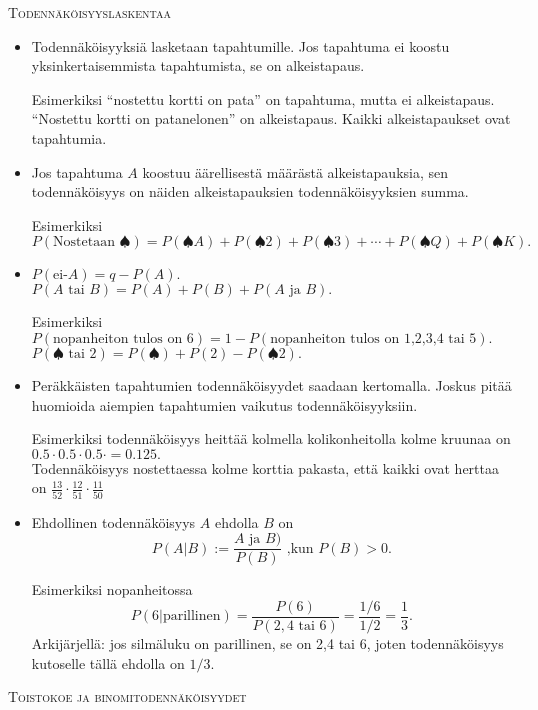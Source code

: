 \documentclass[12pt,leqno,a4paper,oneside]{amsart}
\theoremstyle{definition}
\theoremstyle{remark}
\numberwithin{equation}{section}
\begin{document}
\textsc{Todennäköisyyslaskentaa}
\begin{itemize}
\item
Todennäköisyyksiä lasketaan tapahtumille. Jos tapahtuma ei koostu yksinkertaisemmista tapahtumista, se on alkeistapaus.

Esimerkiksi ``nostettu kortti on pata'' on tapahtuma, mutta ei alkeistapaus. \\
``Nostettu kortti on patanelonen'' on alkeistapaus. Kaikki alkeistapaukset ovat tapahtumia.

\item
Jos tapahtuma $A$ koostuu äärellisestä määrästä alkeistapauksia, sen todennäköisyys on näiden alkeistapauksien todennäköisyyksien summa.

Esimerkiksi 
$$P(\text{Nostetaan }\spadesuit ) = P(\spadesuit A) + P(\spadesuit 2) + P(\spadesuit 3) +\cdots + P(\spadesuit Q ) + P(\spadesuit K).$$

\item
$P(\text{ei-}A) = q - P(A).$\\
$P(A \text{ tai } B) = P(A)+P(B)+P(A\text{ ja } B).$

Esimerkiksi \\
$P(\text{nopanheiton tulos on 6}) = 1 - P(\text{nopanheiton tulos on 1,2,3,4 tai 5}).$\\
$P(\spadesuit \text{ tai } 2) = P(\spadesuit) + P(2) - P(\spadesuit 2).$

\item
Peräkkäisten tapahtumien todennäköisyydet saadaan kertomalla. Joskus pitää huomioida aiempien tapahtumien vaikutus todennäköisyyksiin.

Esimerkiksi todennäköisyys heittää kolmella kolikonheitolla kolme kruunaa on $0.5\cdot 0.5\cdot 0.5\cdot =0.125.$\\
Todennäköisyys nostettaessa kolme korttia pakasta, että kaikki ovat herttaa on
$\frac{13}{52}\cdot\frac{12}{51}\cdot\frac{11}{50}$

\item
Ehdollinen todennäköisyys $A$ ehdolla $B$ on 
$$P(A|B):=\frac{A\text{ ja } B)}{P(B)} \text{ ,kun } P(B)>0.$$

Esimerkiksi nopanheitossa
$$P(6|\text{parillinen}) = \frac{P(6)}{P(2,4 \text{ tai } 6)} = \frac{1/6}{1/2} =\frac{1}{3}.$$ 
Arkijärjellä: jos silmäluku on parillinen, se on 2,4 tai 6, joten todennäköisyys kutoselle tällä ehdolla on $1/3.$

\end{itemize}

\textsc{Toistokoe ja binomitodennäköisyydet}
\end{document}
